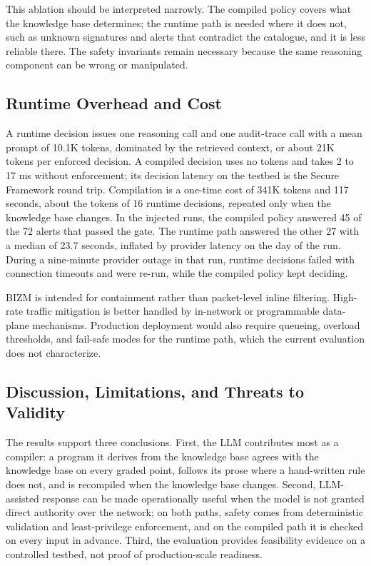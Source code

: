 \documentclass[final,5p]{elsarticle}
\begin{document}
This ablation should be interpreted narrowly. The compiled policy covers what the knowledge base determines; the runtime path is needed where it does not, such as unknown signatures and alerts that contradict the catalogue, and it is less reliable there. The safety invariants remain necessary because the same reasoning component can be wrong or manipulated.

\subsection{Runtime Overhead and Cost}
\label{sec:overhead}

A runtime decision issues one reasoning call and one audit-trace call with a mean prompt of 10.1K tokens, dominated by the retrieved context, or about 21K tokens per enforced decision. A compiled decision uses no tokens and takes 2 to 17 ms without enforcement; its decision latency on the testbed is the Secure Framework round trip. Compilation is a one-time cost of 341K tokens and 117 seconds, about the tokens of 16 runtime decisions, repeated only when the knowledge base changes. In the injected runs, the compiled policy answered 45 of the 72 alerts that passed the gate. The runtime path answered the other 27 with a median of 23.7 seconds, inflated by provider latency on the day of the run. During a nine-minute provider outage in that run, runtime decisions failed with connection timeouts and were re-run, while the compiled policy kept deciding.

BIZM is intended for containment rather than packet-level inline filtering. High-rate traffic mitigation is better handled by in-network or programmable data-plane mechanisms. Production deployment would also require queueing, overload thresholds, and fail-safe modes for the runtime path, which the current evaluation does not characterize.

\subsection{Discussion, Limitations, and Threats to Validity}
\label{sec:discussion_validity}

The results support three conclusions. First, the LLM contributes most as a compiler: a program it derives from the knowledge base agrees with the knowledge base on every graded point, follows its prose where a hand-written rule does not, and is recompiled when the knowledge base changes. Second, LLM-assisted response can be made operationally useful when the model is not granted direct authority over the network; on both paths, safety comes from deterministic validation and least-privilege enforcement, and on the compiled path it is checked on every input in advance. Third, the evaluation provides feasibility evidence on a controlled testbed, not proof of production-scale readiness.
\end{document}
